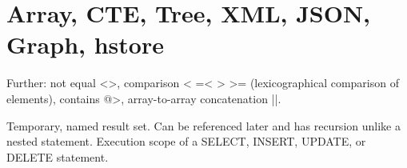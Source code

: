 
\section{Array, CTE, Tree, XML, JSON, Graph, hstore}

\begin{breakbox}

\end{breakbox}

\begin{breakbox}
\end{breakbox}

\begin{breakbox}
\end{breakbox}

\begin{breakbox}
\end{breakbox}

\begin{breakbox}
\end{breakbox}

\begin{breakbox}

Further: not equal <>, comparison < =< > >= (lexicographical comparison of elements), contains @>, array-to-array concatenation ||.
\end{breakbox}

\begin{breakbox}

Temporary, named result set. Can be referenced later and has recursion unlike a nested statement. Execution scope of a SELECT, INSERT, UPDATE, or DELETE statement.


\end{breakbox}

